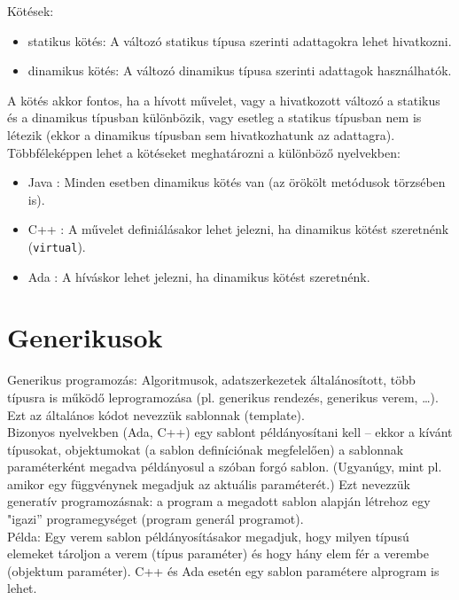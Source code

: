 \documentclass[12pt,margin=0px]{article}
\begin{document}
	\noindent Kötések:
	\begin{itemize}
		\item	statikus kötés: A változó statikus típusa szerinti adattagokra lehet hivatkozni.
		\item	dinamikus kötés: A változó dinamikus típusa szerinti adattagok használhatók.
	\end{itemize}
	
	\noindent A kötés akkor fontos, ha a hívott művelet, vagy a hivatkozott változó a statikus és a dinamikus típusban
	különbözik, vagy esetleg a statikus típusban nem is létezik (ekkor a dinamikus típusban sem hivatkozhatunk
	az adattagra).\\
\newpage
	\noindent Többféleképpen lehet a kötéseket meghatározni a különböző nyelvekben:
	\begin{itemize}
		\item	Java : Minden esetben dinamikus kötés van (az örökölt metódusok törzsében is).
		\item	C++ : A művelet definiálásakor lehet jelezni, ha dinamikus kötést szeretnénk (\texttt{virtual}).
		\item	Ada : A híváskor lehet jelezni, ha dinamikus kötést szeretnénk.
	\end{itemize}

	
	\section{Generikusok}
	
	Generikus programozás: Algoritmusok, adatszerkezetek általánosított, több típusra is működő
	leprogramozása (pl. generikus rendezés, generikus verem, …). Ezt az általános kódot nevezzük sablonnak
	(template).\\
	
	\noindent Bizonyos nyelvekben (Ada, C++) egy sablont példányosítani kell – ekkor a kívánt típusokat, objektumokat
	(a sablon definíciónak megfelelően) a sablonnak paraméterként megadva példányosul a szóban forgó sablon.
	(Ugyanúgy, mint pl. amikor egy függvénynek megadjuk az aktuális paraméterét.) Ezt nevezzük generatív
	programozásnak: a program a megadott sablon alapján létrehoz egy "igazi” programegységet (program
	generál programot).\\
	
	\noindent Példa: Egy verem sablon példányosításakor megadjuk, hogy milyen típusú elemeket tároljon a verem (típus
	paraméter) és hogy hány elem fér a verembe (objektum paraméter).
	C++ és Ada esetén egy sablon paramétere alprogram is lehet.\\
		
\end{document}
